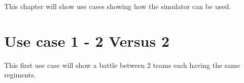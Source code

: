 This chapter will show use cases showing how the simulator can be used.

\section{Use case 1 - 2 Versus 2}
	This first use case will show a battle between 2 teams each having the same regiments.
	